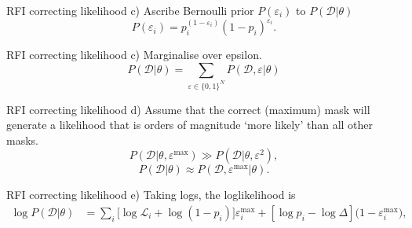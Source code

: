 \documentclass{beamer}
\begin{document}
\begin{frame}{RFI correcting likelihood}
c) Ascribe Bernoulli prior $P(\varepsilon_i)$ to $P(\mathcal{D} | \theta)$
\begin{equation}
        P(\varepsilon_i) = p_i^{(1-\varepsilon_i)}(1-p_i)^{\varepsilon_i}.\label{eq:pei}
        \end{equation}
\end{frame}

\begin{frame}{RFI correcting likelihood}
c) Marginalise over epsilon.
\begin{equation}
P(\mathcal{D} | \theta) =\sum_{\varepsilon \in \{ 0, 1 \} ^N}P(\mathcal{D},\varepsilon|\theta)
\end{equation}
\end{frame}

\begin{frame}{RFI correcting likelihood}
d) Assume that the correct (maximum) mask will generate a likelihood that is orders of magnitude `more likely' than all other masks. 
\begin{equation}
 P(\mathcal{D}|\theta, \varepsilon^{\mathrm{max}}) \gg P(\mathcal{D}|\theta,\varepsilon^{2})\label{eq:nlo},
\end{equation}
\begin{equation}
    P(\mathcal{D}|\theta) \approx P(\mathcal{D},\varepsilon^{\mathrm{max}}|\theta).\label{eq:approx}
\end{equation}

\end{frame}

\begin{frame}{RFI correcting likelihood}
e) Taking logs, the loglikelihood is
\begin{equation}
    \begin{aligned}
    \log{P(\mathcal{D}|\theta)} &= \sum_{i}[{\log{\mathcal{L}_i}+\log({1-p_i})]\varepsilon^{\mathrm{max}}_i + [\log{p}_i - \log{\Delta}](1 - \varepsilon^\mathrm{max}_i})\label{eq:loglikelihood},
    \end{aligned}
\end{equation}
\end{frame}
\end{document}
